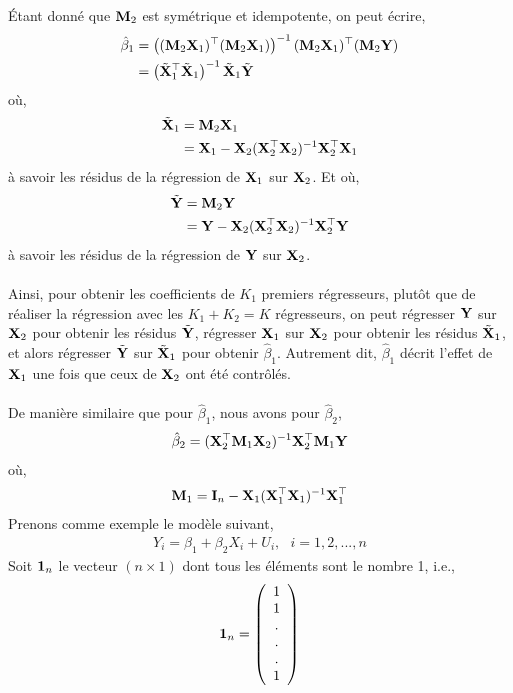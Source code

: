 \'Etant donné que $\mathbf M_2$ est symétrique et idempotente, on peut écrire,
\begin{align*}
\hat{\beta}_1 &= \left((\mathbf M_2\mathbf X_1)^\top(\mathbf M_2\mathbf X_1)\right)^{-1}
(\mathbf M_2\mathbf X_1)^\top(\mathbf M_2\mathbf Y)\\
&=\left(\tilde{\mathbf X}_1^\top\tilde{\mathbf X}_1\right)^{-1}\tilde{\mathbf X}_1\tilde{\mathbf Y}
\end{align*}
où,
\begin{align*}
\tilde{\mathbf X}_1&=\mathbf M_2\mathbf X_1\\
&= \mathbf X_1 - \mathbf X_2(\mathbf X_2^\top\mathbf X_2)^{-1}\mathbf X_2^\top\mathbf X_1
\end{align*}
à savoir les résidus de la régression de $\mathbf X_1$ sur $\mathbf X_2$. Et où,
\begin{align*}
\tilde{\mathbf Y}&=\mathbf M_2\mathbf Y\\
&= \mathbf Y - \mathbf X_2(\mathbf X_2^\top\mathbf X_2)^{-1}\mathbf X_2^\top\mathbf Y
\end{align*}
à savoir les résidus de la régression de $\mathbf Y$ sur $\mathbf X_2$.\\\\
Ainsi, pour obtenir les coefficients de $K_1$ premiers régresseurs, plutôt que de réaliser la régression avec les $K_1+K_2 =K$ régresseurs, on peut régresser $\mathbf Y$ sur $\mathbf X_2$ pour obtenir les résidus $\tilde{\mathbf Y}$, régresser $\mathbf X_1$ sur $\mathbf X_2$ pour obtenir les résidus $\tilde{\mathbf X}_1$, et alors régresser $\tilde{\mathbf Y}$ sur $\tilde{\mathbf X}_1$ pour obtenir $\hat{\beta}_1$. Autrement dit, $\hat{\beta}_1$ décrit l'effet de $\mathbf X_1$ une fois que ceux de $\mathbf X_2$ ont été contrôlés.\\\\
De manière similaire que pour $\hat{\beta}_1$, nous avons pour $\hat{\beta}_2$,
\begin{align*}
\hat{\beta}_2 = (\mathbf X_2^\top\mathbf M_1\mathbf X_2)^{-1} \mathbf X_2^\top\mathbf M_1\mathbf Y
\end{align*}
où,
\begin{align*}
\mathbf M_1 = \mathbf{I}_n - \mathbf X_1(\mathbf X_1^\top\mathbf X_1)^{-1}\mathbf X_1^\top
\end{align*}
Prenons comme exemple le modèle suivant,
\begin{align*}
Y_i = \beta_1 + \beta_2 X_i + U_i, \ \ \ i = 1,2,...,n
\end{align*}
Soit $\mathbf{1}_n$  le vecteur $(n\times 1)$ dont tous les éléments sont le nombre 1, i.e.,
\begin{align*}
\mathbf{1}_n =
\left(
\begin{array}{c}
1\\
1\\
.\\
.\\
.\\
1
\end{array}
\right)
\end{align*}
